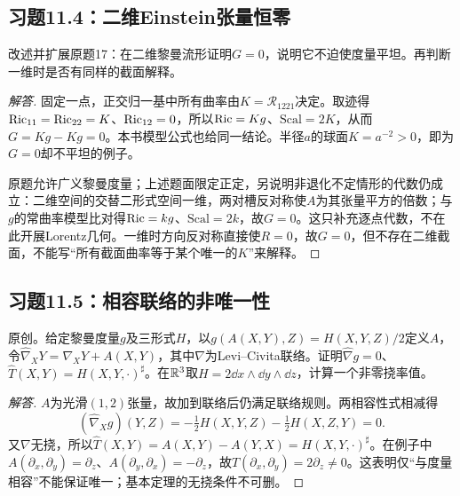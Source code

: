 \subsection*{习题11.4：二维Einstein张量恒零}
改述并扩展原题17：在二维黎曼流形证明$G=0$，说明它不迫使度量平坦。再判断一维时是否有同样的截面解释。
\begin{proof}[解答]
固定一点，正交归一基中所有曲率由$K=\mathcal R_{1221}$决定。取迹得$\operatorname{Ric}_{11}=\operatorname{Ric}_{22}=K$、$\operatorname{Ric}_{12}=0$，所以$\operatorname{Ric}=Kg$、$\mathrm{Scal}=2K$，从而$G=Kg-Kg=0$。本书模型公式也给同一结论。半径$a$的球面$K=a^{-2}>0$，即为$G=0$却不平坦的例子。

原题允许广义黎曼度量；上述题面限定正定，另说明非退化不定情形的代数仍成立：二维空间的交替二形式空间一维，两对槽反对称使$A$为其张量平方的倍数；与$g$的常曲率模型比对得$\operatorname{Ric}=kg$、$\mathrm{Scal}=2k$，故$G=0$。这只补充逐点代数，不在此开展Lorentz几何。一维时方向反对称直接使$R=0$，故$G=0$，但不存在二维截面，不能写“所有截面曲率等于某个唯一的$K$”来解释。
\end{proof}

\subsection*{习题11.5：相容联络的非唯一性}
原创。给定黎曼度量$g$及三形式$H$，以$g(A(X,Y),Z)=H(X,Y,Z)/2$定义$A$，令$\widehat\nabla_XY=\nabla_XY+A(X,Y)$，其中$\nabla$为Levi--Civita联络。证明$\widehat\nabla g=0$、$\widehat T(X,Y)=H(X,Y,\cdot)^\sharp$。在$\mathbb{R}^3$取$H=2\dd x\wedge\dd y\wedge\dd z$，计算一个非零挠率值。
\begin{proof}[解答]
$A$为光滑$(1,2)$张量，故加到联络后仍满足联络规则。两相容性式相减得
\[
 (\widehat\nabla_Xg)(Y,Z)
 =-\tfrac12H(X,Y,Z)-\tfrac12H(X,Z,Y)=0.
\]
又$\nabla$无挠，所以$\widehat T(X,Y)=A(X,Y)-A(Y,X)=H(X,Y,\cdot)^\sharp$。在例子中$A(\partial_x,\partial_y)=\partial_z$、$A(\partial_y,\partial_x)=-\partial_z$，故$\widehat T(\partial_x,\partial_y)=2\partial_z\ne0$。这表明仅“与度量相容”不能保证唯一；基本定理的无挠条件不可删。
\end{proof}

